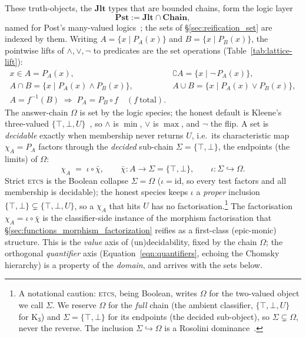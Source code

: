 \documentclass[11pt, a4paper]{article}
\begin{document}
These truth-objects, the $\mathbf{Jlt}$ types that are bounded chains, form the logic layer
\begin{equation}
\label{eqn:pst}
\mathbf{Pst} := \mathbf{Jlt} \cap \mathbf{Chain},
\end{equation}
named for Post's many-valued logics~\cite{post1921general}; the sets of §\ref{sec:reification_set} are indexed by them.
Writing $A = \{x \mid P_A(x)\}$ and $B = \{x \mid P_B(x)\}$, the pointwise lifts of $\wedge, \vee, \neg$ to predicates are the set operations (Table~\ref{tab:lattice-lift}):
\begin{equation}
\label{eqn:lattice-lift-ops}
\begin{aligned}
x \in A = P_A(x), \qquad &
\complement A = \{x \mid \neg\, P_A(x)\}, \\
A \cap B = \{x \mid P_A(x) \wedge P_B(x)\}, &
A \cup B = \{x \mid P_A(x) \vee P_B(x)\}, \\
A = f^{-1}(B) \;\Rightarrow\; P_A = P_B \circ f \quad (f\ \text{total}). &
\end{aligned}
\end{equation}
The answer-chain $\Omega$ is set by the logic species; the honest default is Kleene's three-valued $\{\top, \bot, U\}$~\cite{kleene1952metamathematics}, so $\wedge$ is $\min$, $\vee$ is $\max$, and $\neg$ the flip.
A set is \emph{decidable} exactly when membership never returns $U$, i.e.\ its characteristic map $\chi_A = P_A$ factors through the \emph{decided} sub-chain $\Sigma = \{\top, \bot\}$, the endpoints (the limits) of $\Omega$:
\begin{equation}
\label{eqn:dominance}
\chi_A \;=\; \iota \circ \bar\chi,
\qquad \bar\chi : A \to \Sigma = \{\top, \bot\},
\qquad \iota : \Sigma \hookrightarrow \Omega .
\end{equation}
Strict \textsc{etcs} is the Boolean collapse $\Sigma = \Omega$ ($\iota = \mathrm{id}$, so every test factors and all membership is decidable); the honest species keeps $\iota$ a \emph{proper} inclusion $\{\top, \bot\} \subsetneq \{\top, \bot, U\}$, so a $\chi_A$ that hits $U$ has no factorisation.\footnote{A notational caution: \textsc{etcs}, being Boolean, writes $\Omega$ for the two-valued object we call $\Sigma$.  We reserve $\Omega$ for the \emph{full} chain (the ambient classifier, $\{\top,\bot,U\}$ for $\mathrm{K}_3$) and $\Sigma = \{\top,\bot\}$ for its endpoints (the decided sub-object), so $\Sigma \subsetneq \Omega$, never the reverse.  The inclusion $\Sigma \hookrightarrow \Omega$ is a Rosolini dominance~\cite{rosolini1986continuity}.}
The factorisation $\chi_A = \iota \circ \bar\chi$ is the classifier-side instance of the morphism factorisation that §\ref{sec:functions_morphism_factorization} reifies as a first-class (epic-monic) structure.
This is the \emph{value} axis of (un)decidability, fixed by the chain $\Omega$; the orthogonal \emph{quantifier} axis (Equation~\ref{eqn:quantifiers}, echoing the Chomsky hierarchy) is a property of the \emph{domain}, and arrives with the sets below.
\end{document}
